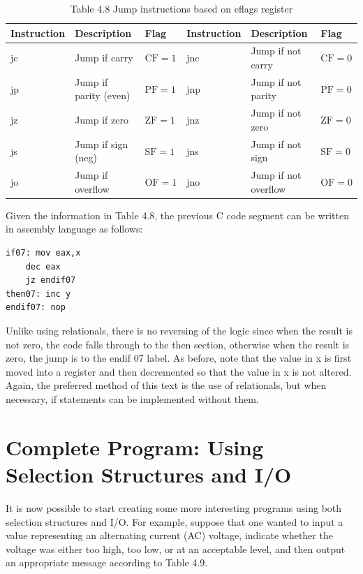 \documentclass[10pt]{book}
\begin{document}
\begin{table}[htbp]
\begin{center}
\captionsetup{labelformat=empty}
\caption{Table 4.8 Jump instructions based on eflags register}
\begin{tabular}{|l|l|l|l|l|l|}
\hline
Instruction & Description & Flag & Instruction & Description & Flag \\

\hline
jc & Jump if carry & $\mathrm{CF}=1$ & jnc & Jump if not carry & $\mathrm{CF}=0$ \\
\hline
jp & Jump if parity (even) & $\mathrm{PF}=1$ & jnp & Jump if not parity & $\mathrm{PF}=0$ \\
\hline
jz & Jump if zero & $\mathrm{ZF}=1$ & jnz & Jump if not zero & $\mathrm{ZF}=0$ \\
\hline
js & Jump if sign (neg) & $\mathrm{SF}=1$ & jns & Jump if not sign & $\mathrm{SF}=0$ \\
\hline
jo & Jump if overflow & $\mathrm{OF}=1$ & jno & Jump if not overflow & $\mathrm{OF}=0$ \\
\hline
\end{tabular}
\end{center}
\end{table}

Given the information in Table 4.8, the previous C code segment can be written in assembly language as follows:

\begin{verbatim}
if07: mov eax,x
    dec eax
    jz endif07
then07: inc y
endif07: nop
\end{verbatim}

Unlike using relationals, there is no reversing of the logic since when the result is not zero, the code falls through to the then section, otherwise when the result is zero, the jump is to the endif 07 label. As before, note that the value in x is first moved into a register and then decremented so that the value in x is not altered. Again, the preferred method of this text is the use of relationals, but when necessary, if statements can be implemented without them.

\section{Complete Program: Using Selection Structures and I/O}
It is now possible to start creating some more interesting programs using both selection structures and I/O. For example, suppose that one wanted to input a value representing an alternating current (AC) voltage, indicate whether the voltage was either too high, too low, or at an acceptable level, and then output an appropriate message according to Table 4.9.
\end{document}
